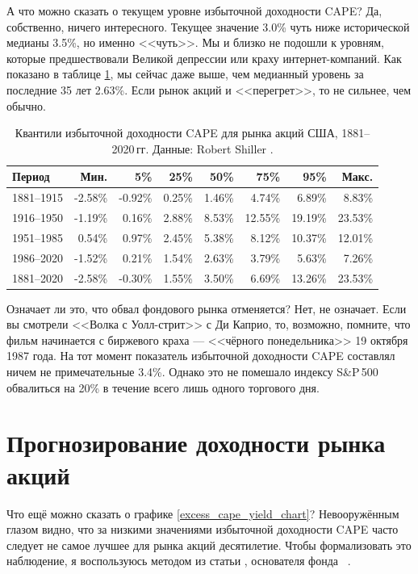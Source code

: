 А что можно сказать о текущем уровне избыточной доходности CAPE? Да, 
собственно, ничего интересного. Текущее значение 3.0\% чуть ниже исторической 
медианы 3.5\%, но именно <<чуть>>. Мы и близко не подошли к уровням, которые 
предшествовали Великой депрессии или краху интернет-компаний. Как показано в 
таблице \ref{cape_excess_yield_quantiles_table}, мы сейчас даже выше, чем 
медианный уровень за последние 35 лет 2.63\%. Если рынок акций и 
<<перегрет>>, то не сильнее, чем обычно.

\begin{table}[h!]
\centering
\begin{tabular}{l|r|r|r|r|r|r|r}
Период       & Мин.      & 5\%       & 25\%   & 50\%    & 75\%      & 95\% & Макс. \\ \hline
1881--1915 & -2.58\% & -0.92\% & 0.25\% & 1.46\% &   4.74\% & 6.89\%  & 8.83\% \\
1916--1950 & -1.19\% &  0.16\% & 2.88\% & 8.53\% & 12.55\%  & 19.19\% & 23.53\% \\
1951--1985 &  0.54\% &  0.97\% & 2.45\% & 5.38\% &   8.12\%  & 10.37\% & 12.01\% \\
1986--2020 & -1.52\% &  0.21\% & 1.54\% & 2.63\% &   3.79\%  & 5.63\%  & 7.26\% \\ \hline
1881--2020 & -2.58\% & -0.30\% & 1.55\% & 3.50\% &   6.69\%  & 13.26\% & 23.53\%
\end{tabular}
\caption{Квантили избыточной доходности CAPE для рынка акций США, 1881--2020\,гг. Данные: Robert Shiller \cite{shillerOnline}.}
\label{cape_excess_yield_quantiles_table}
\end{table}

Означает ли это, что обвал фондового рынка отменяется? Нет, не означает. Если 
вы смотрели <<Волка с Уолл-стрит>> с Ди Каприо, то, возможно, помните, что 
фильм начинается с биржевого краха --- <<чёрного понедельника>> 19 октября 
1987 года. На тот момент показатель избыточной доходности CAPE составлял ничем 
не примечательные 3.4\%. Однако это не помешало индексу S\&P\,500 обвалиться 
на 20\% в течение всего лишь одного торгового дня. 


\section*{Прогнозирование доходности рынка акций}

Что ещё можно сказать о графике \ref{excess_cape_yield_chart}? Невооружённым 
глазом видно, что за низкими значениями избыточной доходности CAPE часто 
следует не самое лучшее для рынка акций десятилетие. Чтобы формализовать это 
наблюдение, я воспользуюсь методом из статьи , основателя фонда \ \cite{asness2012old}.

